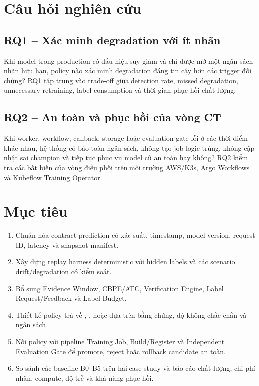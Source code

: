 \section{Câu hỏi nghiên cứu}

\subsection{RQ1 -- Xác minh degradation với ít nhãn}

Khi model trong production có dấu hiệu suy giảm và chỉ được mở một ngân sách nhãn hữu hạn, policy nào xác minh degradation đáng tin cậy hơn các trigger đối chứng? RQ1 tập trung vào trade-off giữa detection rate, missed degradation, unnecessary retraining, label consumption và thời gian phục hồi chất lượng.

\subsection{RQ2 -- An toàn và phục hồi của vòng CT}

Khi worker, workflow, callback, storage hoặc evaluation gate lỗi ở các thời điểm khác nhau, hệ thống có bảo toàn ngân sách, không tạo job logic trùng, không cập nhật sai champion và tiếp tục phục vụ model cũ an toàn hay không? RQ2 kiểm tra các bất biến của vòng điều phối trên môi trường AWS/K3s, Argo Workflows và Kubeflow Training Operator.

\section{Mục tiêu}

\begin{enumerate}
  \item Chuẩn hóa contract prediction có xác suất, timestamp, model version, request ID, latency và snapshot manifest.
  \item Xây dựng replay harness deterministic với hidden labels và các scenario drift/degradation có kiểm soát.
  \item Bổ sung Evidence Window, CBPE/ATC, Verification Engine, Label Request/Feedback và Label Budget.
  \item Thiết kế policy trả về , ,  hoặc  dựa trên bằng chứng, độ không chắc chắn và ngân sách.
  \item Nối policy với pipeline Training Job, Build/Register và Independent Evaluation Gate để promote, reject hoặc rollback candidate an toàn.
  \item So sánh các baseline B0--B5 trên hai case study và báo cáo chất lượng, chi phí nhãn, compute, độ trễ và khả năng phục hồi.
\end{enumerate}


